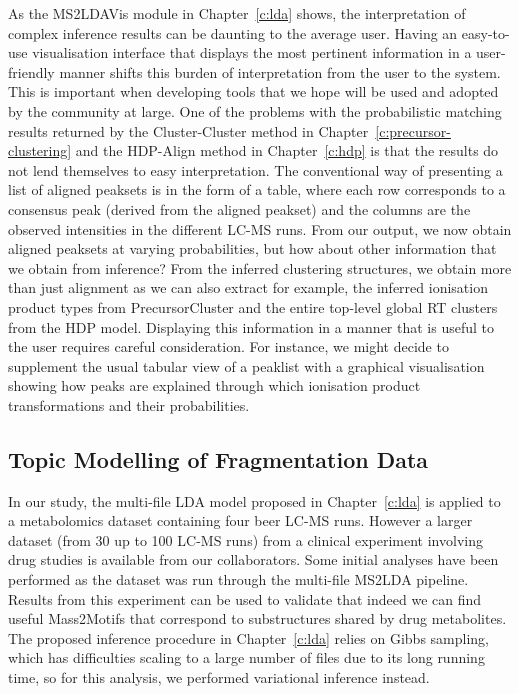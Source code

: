 As the MS2LDAVis module in Chapter~\ref{c:lda} shows, the interpretation of complex inference results can be daunting to the average user. Having an easy-to-use visualisation interface that displays the most pertinent information in a user-friendly manner shifts this burden of interpretation from the user to the system. This is important when developing tools that we hope will be used and adopted by the community at large. One of the problems with the probabilistic matching results returned by the Cluster-Cluster method in Chapter~\ref{c:precursor-clustering} and the HDP-Align method in Chapter~\ref{c:hdp} is that the results do not lend themselves to easy interpretation. The conventional way of presenting a list of aligned peaksets is in the form of a table, where each row corresponds to a consensus peak (derived from the aligned peakset) and the columns are the observed intensities in the different LC-MS runs. From our output, we now obtain aligned peaksets at varying probabilities, but how about other information that we obtain from inference? From the inferred clustering structures, we obtain more than just alignment as we can also extract for example, the inferred ionisation product types from PrecursorCluster and the entire top-level global RT clusters from the HDP model. Displaying this information in a manner that is useful to the user requires careful consideration. For instance, we might decide to supplement the usual tabular view of a peaklist with a graphical visualisation showing how peaks are explained through which ionisation product transformations and their probabilities.

\subsection{Topic Modelling of Fragmentation Data}

In our study, the multi-file LDA model proposed in Chapter~\ref{c:lda} is applied to a metabolomics dataset containing four beer LC-MS runs. However a larger dataset (from 30 up to 100 LC-MS runs) from a clinical experiment involving drug studies is available from our collaborators. Some initial analyses have been performed as the dataset was run through the multi-file MS2LDA pipeline. Results from this experiment can be used to validate that indeed we can find useful Mass2Motifs that correspond to substructures shared by drug metabolites. The proposed inference procedure in Chapter~\ref{c:lda} relies on Gibbs sampling, which has difficulties scaling to a large number of files due to its long running time, so for this analysis, we performed variational inference \cite{Blei2003} instead.

